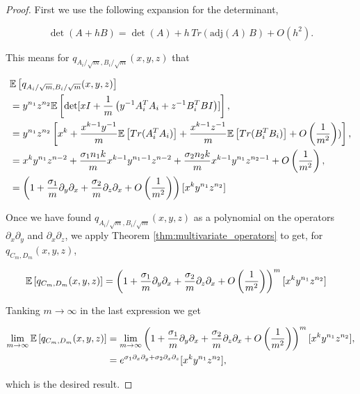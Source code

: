     \begin{proof}
        First we use the following expansion for the determinant,

        \begin{equation*}
            \det( { A} + h { B} ) = \det({ A})  + h \, Tr \left( \mbox{adj} ({A}) \, { B} \right) + O \left(h^2\right).
        \end{equation*}

        This means for $q_{A_i/\sqrt m, B_i/\sqrt m}(x,y,z)$ that

        \begin{align*}
            &\mathbb E \left[ q_{A_i/\sqrt m, B_i/\sqrt m}(x,y,z) \right]\\ &= y^{n_1}z^{n_2}\mathbb E \left[  \det[ xI + \frac{1}{m}\left( y^{-1}A^T_i A_i + z^{-1}B^T_i BI \right) ]  \right], \\ 
            &= y^{n_1}z^{n_2}\left[ x^k + \frac{x^{k-1}y^{-1}}{m}\mathbb E \left[ Tr(A^T_iA_i) \right] + \frac{x^{k-1}z^{-1}}{m}\mathbb E \left[ Tr(B^T_i B_i) \right] + O\left(\frac{1}{m^2}\right))\right],\\ 
            &= x^k y^{n_1}z^{n-2} + \frac{\sigma_1 n_1 k}{m}x^{k-1}y^{n_1-1}z^{n-2} + \frac{\sigma_2 n_2 k}{m}x^{k-1}y^{n_1}z^{n_2-1} + O \left(\frac{1}{m^2}\right), \\
            &= \left( 1 + \frac{\sigma_1}{m}\partial_y\partial_x + \frac{\sigma_2}{m}\partial_z\partial_x + O \left(\frac{1}{m^2}\right)\right)[x^k y^{n_1} z^{n_2}]
        \end{align*}

    Once we have found $q_{A_i/\sqrt m, B_i/\sqrt{m}}(x,y,z)$ as a polynomial on the operators $\partial_x \partial_y$ and $\partial_x \partial_z$, we apply Theorem \ref{thm:multivariate_operators} to get, for $q_{C_m,D_m}(x,y,z)$,

    \begin{align*}
        \mathbb E \left[  q_{C_m,D_m}(x,y,z)  \right] &= \left( 1 + \frac{\sigma_1}{m}\partial_y\partial_x + \frac{\sigma_2}{m}\partial_z\partial_x + O \left(\frac{1}{m^2}\right)\right)^m[x^k y^{n_1} z^{n_2}]
    \end{align*}

    Tanking $m\to \infty$ in the last expression we get

    \begin{align*}
        \lim_{m\to\infty} \mathbb E \left[ q_{C_m,D_m}(x,y,z) \right] &= \lim_{m\to\infty} \left( 1 + \frac{\sigma_1}{m}\partial_y\partial_x + \frac{\sigma_2}{m}\partial_z\partial_x + O \left(\frac{1}{m^2}\right)\right)^m[x^k y^{n_1} z^{n_2}],\\
        &= e^{\sigma_1 \partial_x\partial_y + \sigma_2 \partial_x \partial_z}[x^k y^{n_1}z^{n_2}],
    \end{align*}

    \noindent which is the desired result.
    \end{proof}

